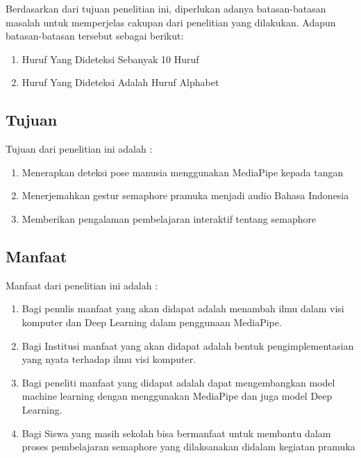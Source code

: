 Berdasarkan dari tujuan penelitian ini, diperlukan adanya batasan-batasan masalah untuk memperjelas cakupan dari penelitian yang dilakukan. Adapun batasan-batasan tersebut sebagai berikut:

\begin{enumerate}
\item Huruf Yang Dideteksi Sebanyak 10 Huruf
\item Huruf Yang Dideteksi Adalah Huruf Alphabet 
\end{enumerate}


\subsection{Tujuan}




Tujuan dari penelitian ini adalah :

\begin{enumerate}   
\item	Menerapkan deteksi pose manusia menggunakan MediaPipe kepada tangan
\item	Menerjemahkan gestur semaphore pramuka menjadi audio Bahasa Indonesia
\item	Memberikan pengalaman pembelajaran interaktif tentang semaphore
\end{enumerate}


\subsection{Manfaat}

Manfaat dari penelitian ini adalah : 

\begin{enumerate}  
\item	Bagi penulis manfaat yang akan didapat adalah menambah ilmu dalam visi komputer dan Deep Learning dalam penggunaan MediaPipe.
\item	Bagi Institusi manfaat yang akan didapat adalah bentuk pengimplementasian yang nyata terhadap ilmu visi komputer.
\item	Bagi peneliti manfaat yang didapat adalah dapat mengembangkan model machine learning dengan menggunakan MediaPipe dan juga model Deep Learning.
\item	Bagi Siswa yang masih sekolah bisa bermanfaat untuk membantu dalam proses pembelajaran semaphore yang dilaksanakan didalam kegiatan pramuka
\end{enumerate}

